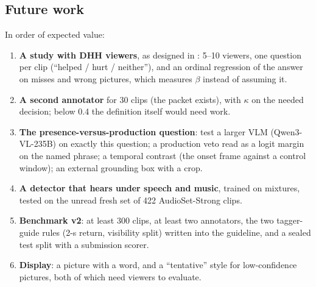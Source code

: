 \subsection{Future work}
In order of expected value:
\begin{enumerate}
  \item \textbf{A study with DHH viewers}, as designed in : 5--10 viewers, one
        question per clip (``helped / hurt / neither''), and an ordinal regression of the answer on misses and wrong
        pictures, which measures $\beta$ instead of assuming it.
  \item \textbf{A second annotator} for 30 clips (the packet exists), with $\kappa$ on the needed decision; below 0.4
        the definition itself would need work.
  \item \textbf{The presence-versus-production question}: test a larger VLM (Qwen3-VL-235B) on exactly this question;
        a production veto read as a logit margin on the named phrase; a temporal contrast (the onset frame against a
        control window); an external grounding box with a crop.
  \item \textbf{A detector that hears under speech and music}, trained on mixtures, tested on the unread fresh set of
        422 AudioSet-Strong clips.
  \item \textbf{Benchmark v2}: at least 300 clips, at least two annotators, the two tagger-guide rules (2-s return,
        visibility split) written into the guideline, and a sealed test split with a submission scorer.
  \item \textbf{Display}: a picture with a word, and a ``tentative'' style for low-confidence pictures, both of which
        need viewers to evaluate.
\end{enumerate}
